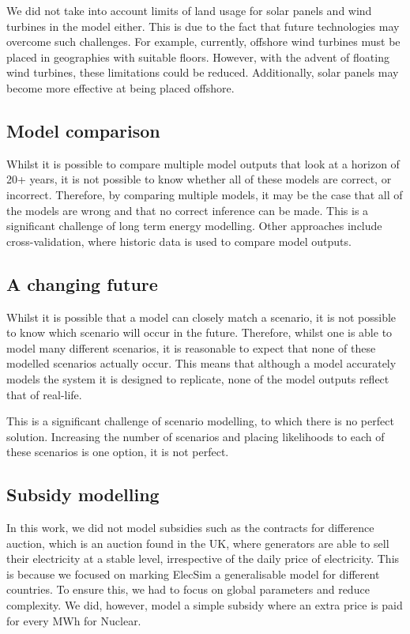 We did not take into account limits of land usage for solar panels and wind turbines in the model either. This is due to the fact that future technologies may overcome such challenges. For example, currently, offshore wind turbines must be placed in geographies with suitable floors. However, with the advent of floating wind turbines, these limitations could be reduced. Additionally, solar panels may become more effective at being placed offshore.

\subsection{Model comparison}

Whilst it is possible to compare multiple model outputs that look at a horizon of 20+ years, it is not possible to know whether all of these models are correct, or incorrect. Therefore, by comparing multiple models, it may be the case that all of the models are wrong and that no correct inference can be made. This is a significant challenge of long term energy modelling. Other approaches include cross-validation, where historic data is used to compare model outputs.

\subsection{A changing future}

Whilst it is possible that a model can closely match a scenario, it is not possible to know which scenario will occur in the future. Therefore, whilst one is able to model many different scenarios, it is reasonable to expect that none of these modelled scenarios actually occur. This means that although a model accurately models the system it is designed to replicate, none of the model outputs reflect that of real-life.

This is a significant challenge of scenario modelling, to which there is no perfect solution. Increasing the number of scenarios and placing likelihoods to each of these scenarios is one option, it is not perfect.

\subsection{Subsidy modelling}

In this work, we did not model subsidies such as the contracts for difference auction, which is an auction found in the UK, where generators are able to sell their electricity at a stable level, irrespective of the daily price of electricity. This is because we focused on marking ElecSim a generalisable model for different countries. To ensure this, we had to focus on global parameters and reduce complexity. We did, however, model a simple subsidy where an extra price is paid for every MWh for Nuclear. 



